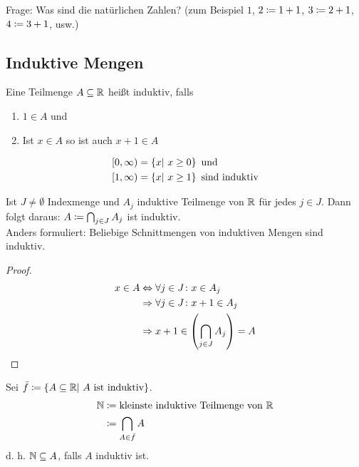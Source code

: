 \thispagestyle{pagenumberonly}
Frage: Was sind die natürlichen Zahlen? (zum Beispiel $1$, $2\coloneqq 1+1$, $3\coloneqq 2+1$, $4\coloneqq 3+1$, usw.)

\subsection{Induktive Mengen}
\begin{definition}
    Eine Teilmenge $A\subseteq \mathbb{R}$ heißt induktiv, falls
    \begin{enumerate}
        \item $1\in A$ und
        \item Ist $x\in A$ so ist auch $x+1\in A$
    \end{enumerate}
\end{definition}

\begin{beispiel}
    \begin{align*}
        \left[0, \infty\right) &= \left\{x|~x\geq 0\right\}\text{ und}\\
        \left[1, \infty\right) &= \left\{x|~x\geq 1\right\} \text{ sind induktiv}
    \end{align*}
\end{beispiel}

\begin{beobachtung}
    Ist $J\neq\emptyset$ Indexmenge und $A_j$ induktive Teilmenge von $\mathbb{R}$ für jedes $j\in J$.
    Dann folgt daraus: $A\coloneqq \bigcap_{j\in J}A_j$ ist induktiv.\\
    Anders formuliert: Beliebige Schnittmengen von induktiven Mengen sind induktiv.
    \begin{proof}
        \begin{align*}
            x\in A &\Leftrightarrow{} \forall j\in J\colon x \in A_j\\
            &\Rightarrow{} \forall j\in J\colon x+1 \in A_j\\
            &\Rightarrow{} x+1 \in \left(\bigcap_{j\in J}A_j\right)=A\qedhere
        \end{align*}
    \end{proof}
\end{beobachtung}

\begin{definition}
    Sei $\bar{f}\coloneqq\left\{A\subseteq \mathbb{R}|~A\text{ ist induktiv}\right\}$.
    \begin{align*}
        \mathbb{N} &\coloneqq \text{kleinste induktive Teilmenge von }\mathbb{R}\\
        &\coloneqq \bigcap_{A\in \bar{f}}A
    \end{align*}
    d. h. $\mathbb{N}\subseteq A$, falls $A$ induktiv ist.
\end{definition}

